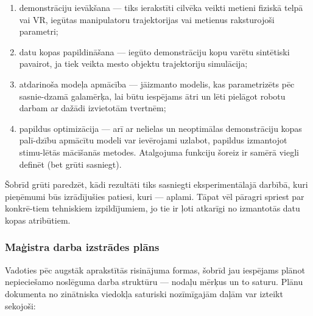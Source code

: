 \documentclass[12pt, a4paper]{article}
\numberwithin{equation}{section} %
\begin{document}
\begin{enumerate}
    \item demonstrāciju ievākšana --- tiks ierakstīti cilvēka veikti metieni fiziskā telpā vai VR, iegūtas manipulatoru trajektorijas vai metienus raksturojoši parametri;
    \item datu kopas papildināšana --- iegūto demonstrāciju kopu varētu sintētiski pavairot, ja tiek veikta mesto objektu trajektoriju simulācija;
    \item atdarinoša modeļa apmācība --- jāizmanto modelis, kas parametrizēts pēc sasnie-dzamā galamērķa, lai būtu iespējams ātri un lēti pielāgot robotu darbam ar dažādi izvietotām tvertnēm;
    \item papildus optimizācija --- arī ar nelielas un neoptimālas demonstrāciju kopas palī-dzību apmācītu modeli var ievērojami uzlabot, papildus izmantojot stimu-lētās mācīšanās metodes. Atalgojuma funkciju šoreiz ir samērā viegli definēt (bet grūti sasniegt).
\end{enumerate}

Šobrīd grūti paredzēt, kādi rezultāti tiks sasniegti eksperimentālajā darbībā, kuri pieņēmumi būs izrādījušies patiesi, kuri --- aplami. Tāpat vēl pāragri spriest par konkrē-tiem tehniskiem izpildījumiem, jo tie ir ļoti atkarīgi no izmantotās datu kopas atribūtiem.

\subsubsection*{Maģistra darba izstrādes plāns}

Vadoties pēc augstāk aprakstītās risinājuma formas, šobrīd jau iespējams plānot nepieciešamo noslēguma darba struktūru --- nodaļu mērķus un to saturu. Plānu dokumenta no zinātniska viedokļa saturiski nozīmīgajām daļām var izteikt sekojoši:
\end{document}
